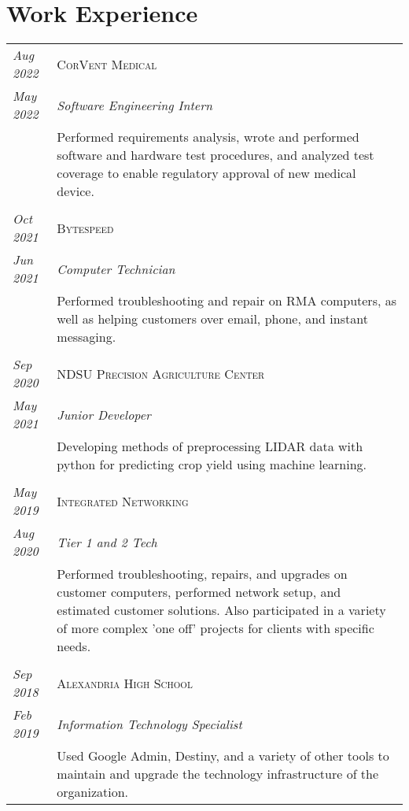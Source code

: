 \documentclass[letterpaper,10pt]{article}
\begin{document}
\section*{Work Experience}
	\begin{tabular}{R{2cm}|p{14cm}}
	\textsl{Aug 2022}	&\textsc{CorVent Medical}\\
	\textsl{May 2022}	&\emph{Software Engineering Intern}\\
	& Performed requirements analysis, wrote and performed software and hardware test procedures, and analyzed test coverage to enable regulatory approval of new medical device.\\
	\\
	\textsl{Oct 2021}	& \textsc{Bytespeed}\\
	\textsl{Jun 2021}	& \emph{Computer Technician}\\
	& Performed troubleshooting and repair on RMA computers, as well as helping customers over email, phone, and instant messaging.\\
	\\
	\textsl{Sep 2020}	& \textsc{NDSU Precision Agriculture Center}\\
	\textsl{May 2021}	& \emph{Junior Developer}\\
	& Developing methods of preprocessing LIDAR data with python for predicting crop yield using machine learning.\\
	\\
	\textsl{May 2019}	& \textsc{Integrated Networking}\\
	\textsl{Aug 2020}	& \emph{Tier 1 and 2 Tech}\\
	& Performed troubleshooting, repairs, and upgrades on customer computers, performed network setup, and estimated customer solutions.
	Also participated in a variety of more complex 'one off' projects for clients with specific needs.\\
	\\
	\textsl{Sep 2018}	& \textsc{Alexandria High School}\\
	\textsl{Feb 2019}	& \emph{Information Technology Specialist}\\
	& Used Google Admin, Destiny, and a variety of other tools to maintain and upgrade the technology infrastructure of the organization.\\
	\end{tabular}
\end{document}
